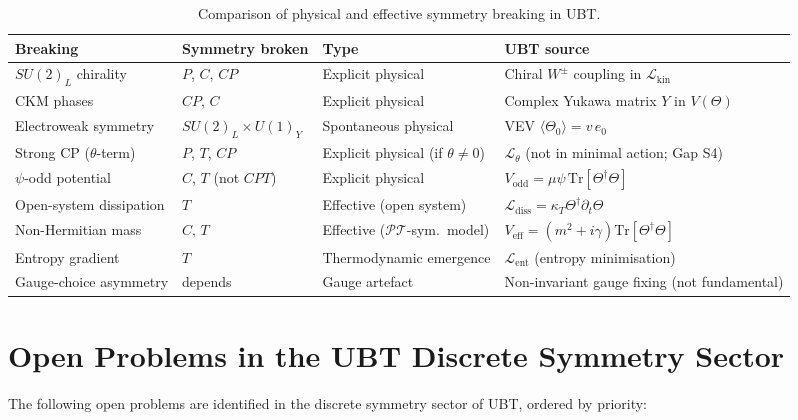 \documentclass[12pt,a4paper]{article}
\theoremstyle{definition}
\theoremstyle{remark}
\begin{document}
\begin{table}[h]
\centering
\caption{Comparison of physical and effective symmetry breaking in UBT.}
\label{tab:cat:comparison}
\renewcommand{\arraystretch}{1.4}
\begin{tabular}{@{}p{4cm}p{3cm}p{3cm}p{4.5cm}@{}}
  \toprule
  Breaking & Symmetry broken & Type & UBT source \\
  \midrule
  $SU(2)_L$ chirality & $P$, $C$, $CP$ & Explicit physical &
    Chiral $W^\pm$ coupling in $\mathcal{L}_{\mathrm{kin}}$ \\
  CKM phases & $CP$, $C$ & Explicit physical &
    Complex Yukawa matrix $Y$ in $V(\Theta)$ \\
  Electroweak symmetry & $SU(2)_L \times U(1)_Y$ & Spontaneous physical &
    VEV $\langle\Theta_0\rangle = v\,e_0$ \\
  Strong CP ($\theta$-term) & $P$, $T$, $CP$ & Explicit physical (if $\theta \neq 0$) &
    $\mathcal{L}_\theta$ (not in minimal action; Gap S4) \\
  $\psi$-odd potential & $C$, $T$ (not $CPT$) & Explicit physical &
    $V_{\mathrm{odd}} = \mu\psi\,\mathrm{Tr}[\Theta^\dagger\Theta]$ \\
  \midrule
  Open-system dissipation & $T$ & Effective (open system) &
    $\mathcal{L}_{\mathrm{diss}} = \kappa_T \Theta^\dagger \partial_t\Theta$ \\
  Non-Hermitian mass & $C$, $T$ & Effective ($\mathcal{PT}$-sym.\  model) &
    $V_{\mathrm{eff}} = (m^2+i\gamma)\mathrm{Tr}[\Theta^\dagger\Theta]$ \\
  Entropy gradient & $T$ & Thermodynamic emergence &
    $\mathcal{L}_{\mathrm{ent}}$ (entropy minimisation) \\
  Gauge-choice asymmetry & depends & Gauge artefact &
    Non-invariant gauge fixing (not fundamental) \\
  \bottomrule
\end{tabular}
\end{table}

\section{Open Problems in the UBT Discrete Symmetry Sector}
\label{sec:cat:open}

The following open problems are identified in the discrete symmetry sector
of UBT, ordered by priority:
\end{document}
